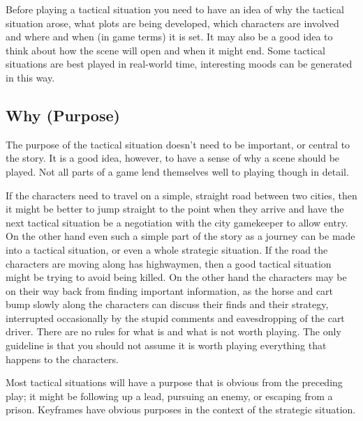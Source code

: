 \documentclass[twoside]{book}
\begin{document}
Before playing a tactical situation you need to have an idea of why
the tactical situation arose, what plots are being developed, which
characters are involved and where and when (in game terms) it is
set. It may also be a good idea to think about how the scene will open
and when it might end. Some tactical situations are best played in
real-world time, interesting moods can be generated in this way.

\subsection{Why (Purpose)}

The purpose of the tactical situation doesn't need to be important, or
central to the story. It is a good idea, however, to have a sense of
why a scene should be played. Not all parts of a game lend themselves
well to playing though in detail.

If the characters need to travel on a simple, straight road between
two cities, then it might be better to jump straight to the point when
they arrive and have the next tactical situation be a negotiation with
the city gamekeeper to allow entry. On the other hand even such a
simple part of the story as a journey can be made into a tactical
situation, or even a whole strategic situation. If the road the
characters are moving along has highwaymen, then a good tactical
situation might be trying to avoid being killed. On the other hand the
characters may be on their way back from finding important
information, as the horse and cart bump slowly along the characters
can discuss their finds and their strategy, interrupted occasionally
by the stupid comments and eavesdropping of the cart driver. There are
no rules for what is and what is not worth playing. The only guideline
is that you should not assume it is worth playing everything that
happens to the characters.

Most tactical situations will have a purpose that is obvious from the
preceding play; it might be following up a lead, pursuing an enemy, or
escaping from a prison. Keyframes have obvious purposes in the context
of the strategic situation.
\end{document}
